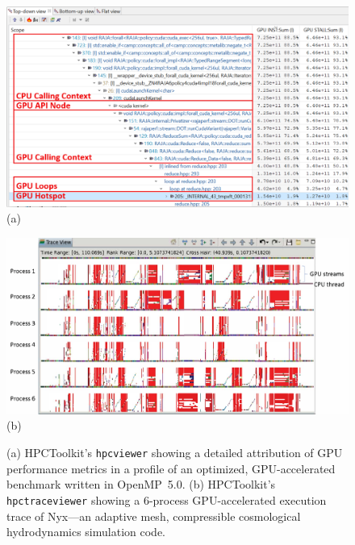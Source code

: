 \begin{figure}[t]
\captionsetup{width=.96\textwidth}
\begin{minipage}[t]{.48\textwidth}
\centering
\includegraphics[width=\textwidth]{projects/2.3.2-Tools/2.3.2.08-HPCToolkit/hpctoolkit-raja-perf}
\\(a)
\end{minipage}
\hfill
\begin{minipage}[t]{.48\textwidth}
\centering
\includegraphics[width=\textwidth]{projects/2.3.2-Tools/2.3.2.08-HPCToolkit/hpctoolkit-nyx-trace}
\\(b)
\end{minipage}
\caption{(a) 
HPCToolkit's {\tt hpcviewer} showing a detailed attribution of GPU performance metrics in a 
profile of an optimized, GPU-accelerated benchmark written in 
OpenMP~5.0.
(b) HPCToolkit's {\tt hpctraceviewer} showing a 6-process GPU-accelerated execution trace of Nyx---an adaptive mesh, compressible cosmological hydrodynamics simulation code.}
\label{fig:hpctoolkit}
\end{figure}

